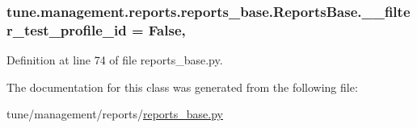 \hypertarget{classtune_1_1management_1_1reports_1_1reports__base_1_1ReportsBase_a00dede100fc4e3a6468f15a057bfc1c1}{
\subsubsection[{\-\_\-\-\_\-filter\-\_\-test\-\_\-profile\-\_\-id}]{\setlength{\rightskip}{0pt plus 5cm}tune.\-management.\-reports.\-reports\-\_\-base.\-Reports\-Base.\-\_\-\-\_\-filter\-\_\-test\-\_\-profile\-\_\-id = False\hspace{0.3cm}{\ttfamily [static]}, {\ttfamily [private]}}}\label{classtune_1_1management_1_1reports_1_1reports__base_1_1ReportsBase_a00dede100fc4e3a6468f15a057bfc1c1}


Definition at line 74 of file reports\-\_\-base.\-py.



The documentation for this class was generated from the following file\-:\begin{DoxyCompactItemize}
\item 
tune/management/reports/\hyperlink{reports__base_8py}{reports\-\_\-base.\-py}\end{DoxyCompactItemize}
